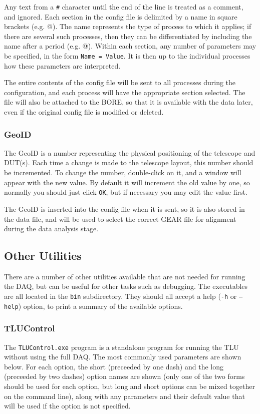 Any text from a \texttt{\#} character until the end of the line is treated as a comment, and
ignored.  
Each section in the config file is delimited by a name in square brackets
(e.g. \verb@[RunControl]@).  
The name represents the type of process to which it applies; if there
are several such processes, then they can be differentiated by including the name after a period
(e.g. @).  
Within each section, any number of parameters may be specified,
in the form \mbox{\texttt{Name = Value}}.  
It is then up to the individual processes how these
parameters are interpreted.

The entire contents of the config file will be sent to all processes during the configuration, and
each process will have the appropriate section selected.  
The file will also be attached to the
\gls{BORE}, so that it is available with the data later, even if the original config file is
modified or deleted.

\subsubsection{GeoID}\label{sec:GeoID}
The GeoID is a number representing the physical positioning of the telescope and DUT(s).
Each time a change is made to the telescope layout, this number should be incremented.
To change the number, double-click on it, and a window will appear with the new value.
By default it will increment the old value by one, so normally you should just click \texttt{OK},
but if necessary you may edit the value first.

The GeoID is inserted into the config file when it is sent, so it is also stored in the data file,
and will be used to select the correct GEAR file for alignment during the data analysis stage.



\subsection{Other Utilities}
There are a number of other utilities available that are not needed for running the DAQ,
but can be useful for other tasks such as debugging.
The executables are all located in the \texttt{bin} subdirectory.
They should all accept a help (\texttt{-h} or \texttt{--help}) option,
to print a summary of the available options.

\subsubsection{TLUControl}
The \texttt{TLUControl.exe} program is a standalone program for running the TLU without using the
full DAQ. The most commonly used parameters are shown below. For each option, the short (preceeded
by one dash) and the long (preceeded by two dashes) option names are shown (only one of the two
forms should be used for each option, but long and short options can be mixed together on the
command line), along with any parameters and their default value that will be used if the option is
not specified.

